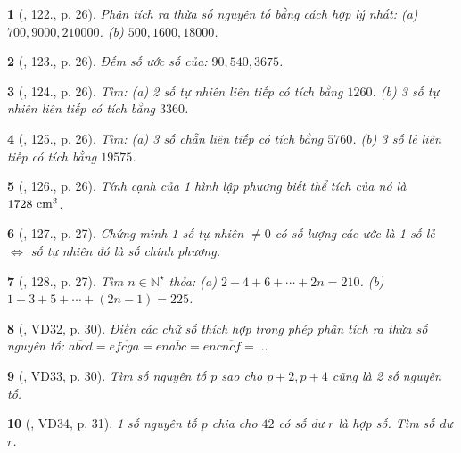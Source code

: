 \documentclass{article}
\newtheorem{baitoan}{}
\begin{document}
\begin{baitoan}[\cite{Tuyen_Toan_6}, 122., p. 26]
	Phân tích ra thừa số nguyên tố bằng cách hợp lý nhất: (a) $700,9000,210000$. (b) $500,1600,18000$.
\end{baitoan}

\begin{baitoan}[\cite{Tuyen_Toan_6}, 123., p. 26]
	Đếm số ước số của: $90,540,3675$.
\end{baitoan}

\begin{baitoan}[\cite{Tuyen_Toan_6}, 124., p. 26]
	Tìm: (a) 2 số tự nhiên liên tiếp có tích bằng $1260$. (b) 3 số tự nhiên liên tiếp có tích bằng $3360$.
\end{baitoan}

\begin{baitoan}[\cite{Tuyen_Toan_6}, 125., p. 26]
	Tìm: (a) 3 số chẵn liên tiếp có tích bằng $5760$. (b) 3 số lẻ liên tiếp có tích bằng $19575$.
\end{baitoan}

\begin{baitoan}[\cite{Tuyen_Toan_6}, 126., p. 26]
	Tính cạnh của 1 hình lập phương biết thể tích của nó là $\rm1728\ cm^3$.
\end{baitoan}

\begin{baitoan}[\cite{Tuyen_Toan_6}, 127., p. 27]
	Chứng minh 1 số tự nhiên $\ne0$ có số lượng các ước là 1 số lẻ $\Leftrightarrow$ số tự nhiên đó là số chính phương.
\end{baitoan}

\begin{baitoan}[\cite{Tuyen_Toan_6}, 128., p. 27]
	Tìm $n\in\mathbb{N}^\star$ thỏa: (a) $2 + 4 + 6 + \cdots + 2n = 210$. (b) $1 + 3 + 5 + \cdots + (2n - 1) = 225$.
\end{baitoan}

\begin{baitoan}[\cite{Binh_Toan_6_tap_1}, VD32, p. 30]
	Điền các chữ số thích hợp trong phép phân tích ra thừa số nguyên tố: $\overline{abcd} = e\overline{fcga} = en\overline{abc} = enc\overline{ncf} = \ldots$
\end{baitoan}

\begin{baitoan}[\cite{Binh_Toan_6_tap_1}, VD33, p. 30]
	Tìm số nguyên tố $p$ sao cho $p + 2,p + 4$ cũng là 2 số nguyên tố.
\end{baitoan}

\begin{baitoan}[\cite{Binh_Toan_6_tap_1}, VD34, p. 31]
	1 số nguyên tố $p$ chia cho $42$ có số dư $r$ là hợp số. Tìm số dư $r$.
\end{baitoan}
\end{document}
